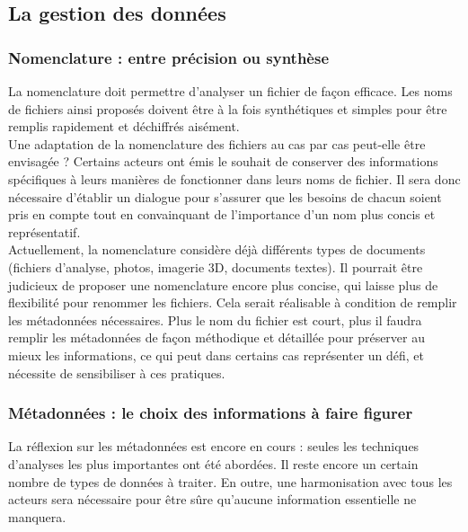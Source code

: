         \subsection{La gestion des données}
            \subsubsection{Nomenclature : entre précision ou synthèse}

La nomenclature doit permettre d’analyser un fichier de façon efficace. Les noms de fichiers ainsi proposés doivent être à la fois synthétiques et simples pour être remplis rapidement et déchiffrés aisément.\\

Une adaptation de la nomenclature des fichiers au cas par cas peut-elle être envisagée ? Certains acteurs ont émis le souhait de conserver des informations spécifiques à leurs manières de fonctionner dans leurs noms de fichier. Il sera donc nécessaire d'établir un dialogue pour s'assurer que les besoins de chacun soient pris en compte tout en convainquant de l'importance d'un nom plus concis et représentatif.\\

Actuellement, la nomenclature considère déjà différents types de documents (fichiers d’analyse, photos, imagerie 3D, documents textes). Il pourrait être judicieux de proposer une nomenclature encore plus concise, qui laisse plus de flexibilité pour renommer les fichiers. Cela serait réalisable à condition de remplir les métadonnées nécessaires. Plus le nom du fichier est court, plus il faudra remplir les métadonnées de façon méthodique et détaillée pour préserver au mieux les informations, ce qui peut dans certains cas représenter un défi, et nécessite de sensibiliser à ces pratiques.
        
            \subsubsection{Métadonnées : le choix des informations à faire figurer}

La réflexion sur les métadonnées est encore en cours : seules les techniques d'analyses les plus importantes ont été abordées. Il reste encore un certain nombre de types de données à traiter. En outre, une harmonisation avec tous les acteurs sera nécessaire pour être sûre qu’aucune information essentielle ne manquera.\\

